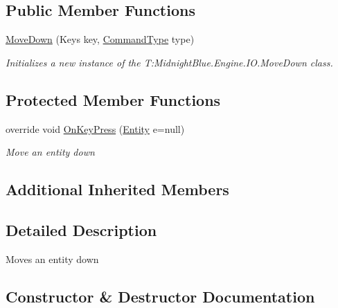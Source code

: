 \subsection*{Public Member Functions}
\begin{DoxyCompactItemize}
\item 
\hyperlink{class_midnight_blue_1_1_engine_1_1_i_o_1_1_move_down_a94daa0c2ad644a4dff6b8cdedcfdbf7f}{Move\+Down} (Keys key, \hyperlink{namespace_midnight_blue_1_1_engine_1_1_i_o_a8bc3f159399ecadd590f7df1b54354b0}{Command\+Type} type)
\begin{DoxyCompactList}\small\item\em Initializes a new instance of the T\+:\+Midnight\+Blue.\+Engine.\+I\+O.\+Move\+Down class. \end{DoxyCompactList}\end{DoxyCompactItemize}
\subsection*{Protected Member Functions}
\begin{DoxyCompactItemize}
\item 
override void \hyperlink{class_midnight_blue_1_1_engine_1_1_i_o_1_1_move_down_aeeed692e99119e5818051a87956c80d1}{On\+Key\+Press} (\hyperlink{class_midnight_blue_1_1_engine_1_1_entity_component_1_1_entity}{Entity} e=null)
\begin{DoxyCompactList}\small\item\em Move an entity down \end{DoxyCompactList}\end{DoxyCompactItemize}
\subsection*{Additional Inherited Members}


\subsection{Detailed Description}
Moves an entity down 



\subsection{Constructor \& Destructor Documentation}
\hypertarget{class_midnight_blue_1_1_engine_1_1_i_o_1_1_move_down_a94daa0c2ad644a4dff6b8cdedcfdbf7f}{}\label{class_midnight_blue_1_1_engine_1_1_i_o_1_1_move_down_a94daa0c2ad644a4dff6b8cdedcfdbf7f} 
